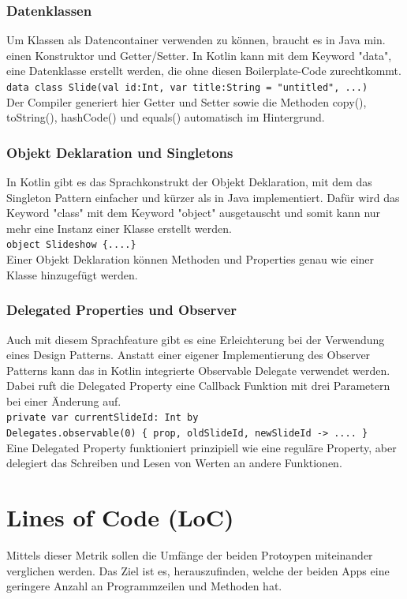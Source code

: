 \documentclass{sigchi-ext}
\begin{document}
\subsubsection{Datenklassen}
Um Klassen als Datencontainer verwenden zu können, braucht es in Java min. einen Konstruktor und Getter/Setter. In Kotlin kann mit dem Keyword "data", eine Datenklasse erstellt werden, die ohne diesen Boilerplate-Code zurechtkommt. \\ \texttt{data class Slide(val id:Int,
                 var title:String = "untitled", ...)} \\ Der Compiler generiert hier Getter und Setter sowie die Methoden copy(), toString(), hashCode() und equals() automatisch im Hintergrund.
\cite{samuel2017programming} 

\subsubsection{Objekt Deklaration und Singletons}
In Kotlin gibt es das Sprachkonstrukt der Objekt Deklaration, mit dem das Singleton Pattern einfacher und kürzer als in Java implementiert. Dafür wird das Keyword "class" mit dem Keyword "object" ausgetauscht und somit kann nur mehr eine Instanz einer Klasse erstellt werden. \\\texttt{object Slideshow \{....\}} \\Einer Objekt Deklaration können Methoden und Properties genau wie einer Klasse hinzugefügt werden. \cite{moskala2017android}


\subsubsection{Delegated Properties und Observer}
Auch mit diesem Sprachfeature gibt es eine Erleichterung bei der Verwendung eines Design Patterns. Anstatt einer eigener Implementierung des Observer Patterns kann das in Kotlin integrierte Observable Delegate verwendet werden. Dabei ruft die Delegated Property eine Callback Funktion mit drei Parametern bei einer Änderung auf. \\ \texttt{private var currentSlideId: Int by \\Delegates.observable(0) \{ prop, oldSlideId, newSlideId -> .... \}} \\ Eine Delegated Property funktioniert prinzipiell wie eine reguläre Property, aber delegiert das Schreiben und Lesen von Werten an andere Funktionen. \cite{delegates}

\section{Lines of Code (LoC)}
Mittels dieser Metrik sollen die Umfänge der beiden Protoypen miteinander verglichen werden. Das Ziel ist es, herauszufinden, welche der beiden Apps eine geringere Anzahl an Programmzeilen und Methoden hat.
\end{document}
